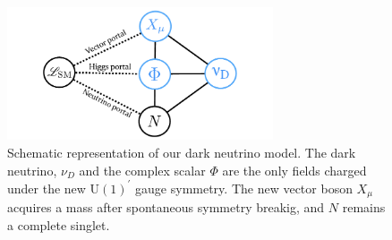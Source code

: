 \graphicspath{{}{three_portals/}}

\begin{figure}[t]
\centering\includegraphics[width=0.7\textwidth]{three_portals/portals.pdf}
\caption{Schematic representation of our dark neutrino model. The dark neutrino, $\nu_{D}$ and the complex scalar $\Phi$ are the only fields charged under the new U$(1)^\prime$ gauge symmetry. The new vector boson $X_\mu$ acquires a mass after spontaneous symmetry breakig, and $N$ remains a complete singlet.
\label{fig:Tdiagrams}}
\end{figure}
